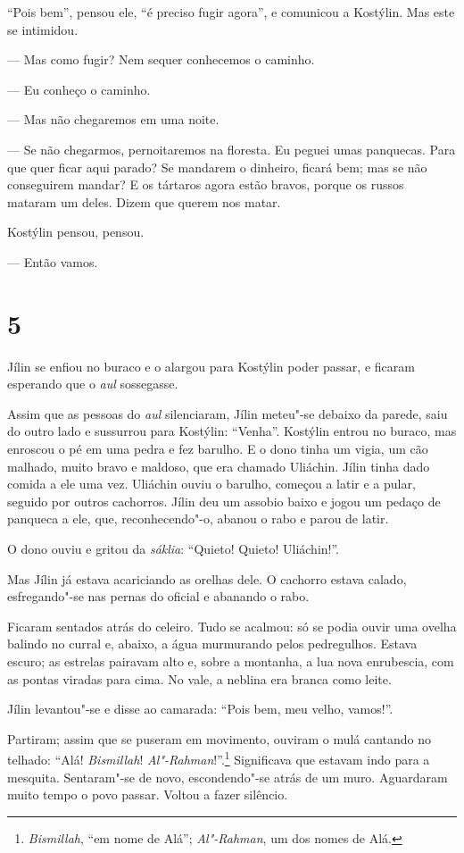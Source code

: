 ``Pois bem'', pensou ele, ``é preciso fugir agora'', e comunicou a
Kostýlin. Mas este se intimidou.

--- Mas como fugir? Nem sequer conhecemos o caminho.

--- Eu conheço o caminho.

--- Mas não chegaremos em uma noite.

--- Se não chegarmos, pernoitaremos na floresta. Eu peguei umas
panquecas. Para que quer ficar aqui parado? Se mandarem o dinheiro,
ficará bem; mas se não conseguirem mandar? E os tártaros agora estão
bravos, porque os russos mataram um deles. Dizem que querem nos matar.

Kostýlin pensou, pensou.

--- Então vamos.

\section{5}

Jílin se enfiou no buraco e o alargou para Kostýlin poder passar, e
ficaram esperando que o \emph{aul} sossegasse.

Assim que as pessoas do \emph{aul} silenciaram, Jílin meteu"-se debaixo
da parede, saiu do outro lado e sussurrou para Kostýlin: ``Venha''.
Kostýlin entrou no buraco, mas enroscou o pé em uma pedra e fez barulho.
E o dono tinha um vigia, um cão malhado, muito bravo e maldoso, que era
chamado Uliáchin. Jílin tinha dado comida a ele uma vez. Uliáchin ouviu
o barulho, começou a latir e a pular, seguido por outros cachorros.
Jílin deu um assobio baixo e jogou um pedaço de panqueca a ele, que, reconhecendo"-o, abanou o rabo e parou de latir.

O dono ouviu e gritou da \emph{sáklia}: ``Quieto! Quieto! Uliáchin!''.

Mas Jílin já estava acariciando as orelhas dele. O cachorro
estava calado, esfregando"-se nas pernas do oficial e abanando o rabo.

Ficaram sentados atrás do celeiro. Tudo se acalmou: só se podia ouvir uma
ovelha balindo no curral e, abaixo, a água murmurando pelos pedregulhos.
Estava escuro; as estrelas pairavam alto e, sobre a montanha, a lua nova
enrubescia, com as pontas viradas para cima. No vale, a neblina era
branca como leite.

Jílin levantou"-se e disse ao camarada: ``Pois bem, meu velho, vamos!''.

Partiram; assim que se puseram em movimento, ouviram o mulá cantando no
telhado: ``Alá! \emph{Bismillah}! \emph{Al"-Rahman}!''.\footnote{\emph{Bismillah},
  ``em nome de Alá''; \emph{Al"-Rahman}, um dos nomes de Alá.}
Significava que estavam indo para a mesquita. Sentaram"-se de novo,
escondendo"-se atrás de um muro. Aguardaram muito tempo o povo passar.
Voltou a fazer silêncio.

